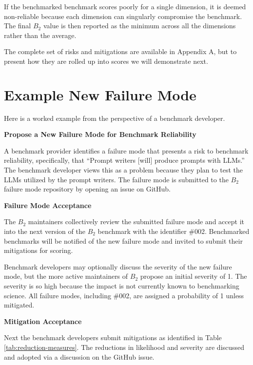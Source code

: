 \documentclass{article}
\newcommand\bb{$B_2$ }
\begin{document}
If the benchmarked benchmark scores poorly for a single dimension, it is deemed non-reliable because each dimension can singularly compromise the benchmark. The final \bb value is then reported as the minimum across all the dimensions rather than the average.

The complete set of risks and mitigations are available in Appendix A, but to present how they are rolled up into scores we will demonstrate next.
\section{Example New Failure Mode}
Here is a worked example from the perspective of a benchmark developer.

\textbf{Propose a New Failure Mode for Benchmark Reliability}

A benchmark provider identifies a failure mode that presents a risk to benchmark reliability, specifically, that ``Prompt writers [will] produce prompts with LLMs.'' The benchmark developer views this as a problem because they plan to test the LLMs utilized by the prompt writers. The failure mode is submitted to the \bb failure mode repository by opening an issue on GitHub.

\textbf{Failure Mode Acceptance}

The \bb maintainers collectively review the submitted failure mode and accept it into the next version of the \bb benchmark with the identifier \#002. Benchmarked benchmarks will be notified of the new failure mode and invited to submit their mitigations for scoring.

Benchmark developers may optionally discuss the severity of the new failure mode, but the more active maintainers of \bb propose an initial severity of 1. The severity is so high because the impact is not currently known to benchmarking science. All failure modes, including \#002, are assigned a probability of 1 unless mitigated.

\textbf{Mitigation Acceptance}

Next the benchmark developers submit mitigations as identified in Table \ref{tab:reduction-measures}. The reductions in likelihood and severity are discussed and adopted via a discussion on the GitHub issue.
\end{document}
